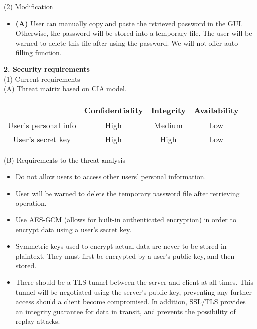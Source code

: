 \documentclass[11pt, letterpaper]{article}
\newcommand{\DesignSection}[1]
{\noindent\textbf{#1}\\}
\begin{document}
\smallskip
\noindent(2) Modification
\begin{itemize} \itemsep1pt \parskip0pt 
    \item \textbf{(A) }User can manually copy and paste the retrieved password in the \ac{GUI}. Otherwise, the password will be stored into a temporary file. The user will be warned to delete this file after using the password. We will not offer auto filling function.
\end{itemize}

\DesignSection{2. Security requirements}
\noindent(1) Current requirements\\
\indent(A) Threat matrix based on CIA model.

\setlength{\tabcolsep}{5pt}
\indent\begin{tabular}{| c | c | c | c |}
    \toprule
      & Confidentiality & Integrity & Availability \\
    \midrule
    User's personal info & High & Medium & Low \\
    \midrule
    User's secret key & High & High & Low \\
    \bottomrule
\end{tabular}

\smallskip
\indent(B) Requirements to the threat analysis
\begin{itemize} \itemsep1pt \parskip0pt 
\item Do not allow users to access other users’ personal information.
\item User will be warned to delete the temporary password file after retrieving operation.
\item Use AES-GCM (allows for built-in authenticated encryption) in order to encrypt data using a user’s secret key.
\item Symmetric keys used to encrypt actual data are never to be stored in plaintext. They must first be encrypted by a user’s public key, and then stored.
\item There should be a \ac{TLS} tunnel between the server and client at all times. This tunnel will be negotiated using the server’s public key, preventing any further access should a client become compromised. In addition, \ac{SSL}/\ac{TLS} provides an integrity guarantee for data in transit, and prevents the possibility of replay attacks.
\end{itemize}
\end{document}
